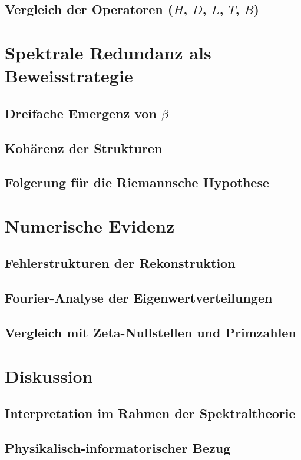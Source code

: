 \documentclass[12pt]{article}
\begin{document}
\subsection{Vergleich der Operatoren (\texorpdfstring{$H$, $D$, $L$, $T$, $B$}{H, D, L, T, B})}

\section{Spektrale Redundanz als Beweisstrategie}
\subsection{Dreifache Emergenz von \texorpdfstring{$\beta$}{beta}}
\subsection{Kohärenz der Strukturen}
\subsection{Folgerung für die Riemannsche Hypothese}

\section{Numerische Evidenz}
\subsection{Fehlerstrukturen der Rekonstruktion}
\subsection{Fourier-Analyse der Eigenwertverteilungen}
\subsection{Vergleich mit Zeta-Nullstellen und Primzahlen}

\section{Diskussion}
\subsection{Interpretation im Rahmen der Spektraltheorie}
\subsection{Physikalisch-informatorischer Bezug}
\end{document}
